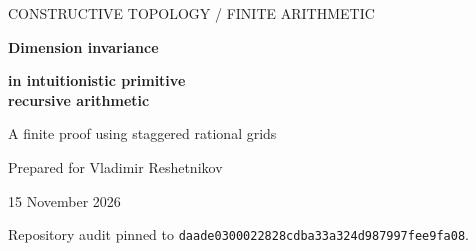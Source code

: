 \documentclass[11pt,a4paper]{article}
\theoremstyle{definition}
\newcommand{\Q}{\mathbb Q}\newcommand{\R}{\mathbb R}
\newcommand{\sha}{\texttt{daade0300022828cdba33a324d987997fee9fa08}}
\begin{document}
\hypersetup{pageanchor=false}
\begin{titlepage}
\vspace*{13mm}
{\color{accent}\large CONSTRUCTIVE TOPOLOGY / FINITE ARITHMETIC\par}
\vspace{12mm}
{\color{ink}\Huge\bfseries Dimension invariance\par}
\vspace{5mm}
{\color{ink}\LARGE\bfseries in intuitionistic primitive\\
recursive arithmetic\par}
\vspace{8mm}
{\Large A finite proof using staggered rational grids\par}
\vspace{15mm}
{\large Prepared for Vladimir Reshetnikov\par}
{\large 15 November 2026\par}
\vfill
\begin{abstract}
We give an explicit, finite obstruction to lowering dimension. For $d\geq1$, let
$F:\{0,\ldots,N\}^{d}\to\Q^{m}$ be a rational table, with $N\geq1$ and
$h>0$. If every pair of opposite source faces has image separation at
least $h$, and every standard Kuhn simplex has image diameter less than
$h/d$, then $d\leq m$. The proof consists of a cubical Sperner parity
calculation and rational floor computations on $d$ differently shifted
grids. It yields a primitive recursive procedure which, when $d>m$,
returns either a close opposite-face pair or a simplex with large image
variation.

From this finite theorem we derive approximate opposite-face collisions
for uniformly presented maps, and dimension invariance for homeomorphisms
given with primitive recursive rational evaluations and local uniform
continuity moduli for both directions. We state the precise first-order
arithmetic schema, identify the quantifier-free induction invariants,
and explain how to construct an object-language derivation using the
existing \texttt{ConciseIPRA} development.

The human-readable mathematical argument is complete. The accompanying
Lean file is a detailed, explicitly unfinished formalization blueprint.
The exact-arithmetic Python artifacts are executable checks and witness
extractors; they are not a substitute for a Lean or iPRA proof certificate.
\end{abstract}
\vspace{7mm}
{\small Repository audit pinned to \sha.\par}
\end{titlepage}
\hypersetup{pageanchor=true}
\setcounter{tocdepth}{1}
\tableofcontents
\newpage
\end{document}
